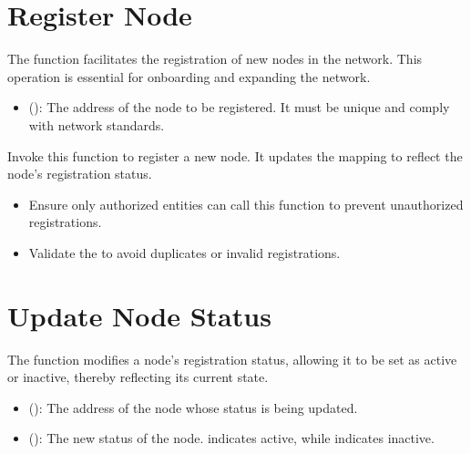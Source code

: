 \documentclass[a4paper,10pt,english]{sphinxmanual}
\begin{document}
\sphinxAtStartPar
{}


\section{Register Node}
\label{\detokenize{docs_node_manager_contract:register-node}}
\sphinxAtStartPar
The  function facilitates the registration of new nodes in the network. This operation is essential for onboarding and expanding the network.

\sphinxAtStartPar
{}
\begin{itemize}
\item {} 
\sphinxAtStartPar
{} ():
The address of the node to be registered. It must be unique and comply with network standards.

\end{itemize}

\sphinxAtStartPar
{}

\sphinxAtStartPar
Invoke this function to register a new node. It updates the  mapping to reflect the node’s registration status.

\sphinxAtStartPar
{}
\begin{itemize}
\item {} 
\sphinxAtStartPar
{} Ensure only authorized entities can call this function to prevent unauthorized registrations.

\item {} 
\sphinxAtStartPar
{} Validate the  to avoid duplicates or invalid registrations.

\end{itemize}


\section{Update Node Status}
\label{\detokenize{docs_node_manager_contract:update-node-status}}
\sphinxAtStartPar
The  function modifies a node’s registration status, allowing it to be set as active or inactive, thereby reflecting its current state.

\sphinxAtStartPar
{}
\begin{itemize}
\item {} 
\sphinxAtStartPar
{} ():
The address of the node whose status is being updated.

\item {} 
\sphinxAtStartPar
{} ():
The new status of the node.  indicates active, while  indicates inactive.

\end{itemize}
\end{document}
